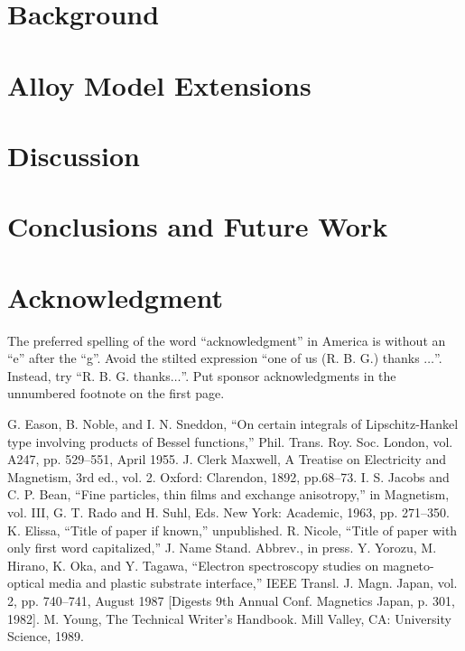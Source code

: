 \documentclass[conference]{IEEEtran}
\begin{document}
\section{Background}

\section{Alloy Model Extensions}

\section{Discussion}

\section{Conclusions and Future Work}



\section*{Acknowledgment}

The preferred spelling of the word ``acknowledgment'' in America is without 
an ``e'' after the ``g''. Avoid the stilted expression ``one of us (R. B. 
G.) thanks $\ldots$''. Instead, try ``R. B. G. thanks$\ldots$''. Put sponsor 
acknowledgments in the unnumbered footnote on the first page.




\begin{thebibliography}{00}
 G. Eason, B. Noble, and I. N. Sneddon, ``On certain integrals of Lipschitz-Hankel type involving products of Bessel functions,'' Phil. Trans. Roy. Soc. London, vol. A247, pp. 529--551, April 1955.
 J. Clerk Maxwell, A Treatise on Electricity and Magnetism, 3rd ed., vol. 2. Oxford: Clarendon, 1892, pp.68--73.
 I. S. Jacobs and C. P. Bean, ``Fine particles, thin films and exchange anisotropy,'' in Magnetism, vol. III, G. T. Rado and H. Suhl, Eds. New York: Academic, 1963, pp. 271--350.
 K. Elissa, ``Title of paper if known,'' unpublished.
 R. Nicole, ``Title of paper with only first word capitalized,'' J. Name Stand. Abbrev., in press.
 Y. Yorozu, M. Hirano, K. Oka, and Y. Tagawa, ``Electron spectroscopy studies on magneto-optical media and plastic substrate interface,'' IEEE Transl. J. Magn. Japan, vol. 2, pp. 740--741, August 1987 [Digests 9th Annual Conf. Magnetics Japan, p. 301, 1982].
 M. Young, The Technical Writer's Handbook. Mill Valley, CA: University Science, 1989.
\end{thebibliography}
\vspace{12pt}
\end{document}
